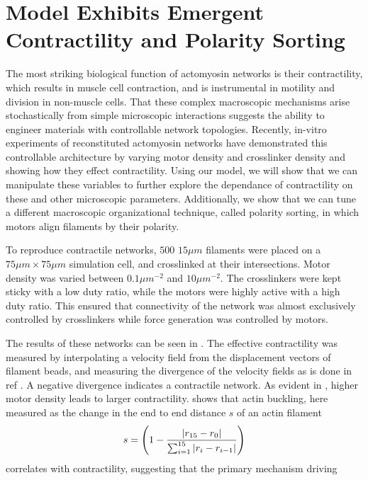 \documentclass[12pt]{article}
\begin{document}
\section{Model Exhibits Emergent Contractility and Polarity Sorting}
The most striking biological function of actomyosin networks is their contractility, which results in muscle cell
contraction, and is instrumental in motility and division in non-muscle cells. 
That these complex macroscopic mechanisms arise stochastically from simple microscopic interactions suggests the ability
to engineer materials with controllable network topologies. 
Recently, in-vitro experiments of
reconstituted actomyosin networks have demonstrated this controllable architecture by varying motor density and
crosslinker density and showing how they effect contractility\cite{murrell2012, murrell2014}. Using our model,
we will show that we can manipulate these variables to further explore the dependance of contractility on these 
and other microscopic parameters. 
Additionally, we show that we can tune a different macroscopic organizational technique, called polarity sorting, 
in which motors align filaments by their polarity. 
\par
To reproduce contractile networks, $500$ $15\mu m$ filaments were placed on a $75\mu m\times 75\mu m$ simulation cell, and
crosslinked at their intersections. Motor density was varied between $0.1\mu
m^{-2}$ and $10\mu m^{-2}$. The crosslinkers were kept sticky with a low duty ratio, while the motors were highly active
with a high duty ratio. This ensured that connectivity of the network was almost exclusively controlled by crosslinkers
while force generation was controlled by motors. 
\par
The results of these networks can be seen in . The effective contractility was measured by
interpolating a velocity field from the displacement vectors of filament beads, and measuring the divergence of the
velocity fields as is done in ref \cite{murrell2014}. A negative divergence indicates a contractile network. As evident
in , higher motor density leads to larger contractility.  shows
that actin buckling, here measured as the change in the end to end distance $s$ of an actin filament
\begin{equation}
  s = \left(1 - {|r_{15}-r_0|\over\sum_{i=1}^{15}{|r_i-r_{i-1}|}}\right) 
  \label{eqn:fil_strain}
\end{equation}
correlates with contractility, suggesting that the primary mechanism driving
\end{document}
